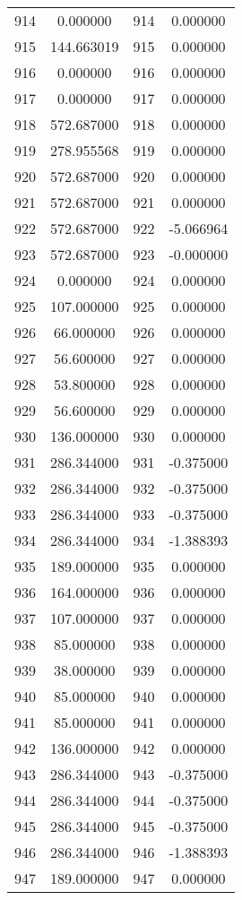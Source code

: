 \documentclass[12pt]{article}
\begin{document}
\begin{longtable}{@{}cccc@{}}
914 & 0.000000 & 914 & 0.000000 \\
915 & 144.663019 & 915 & 0.000000 \\
916 & 0.000000 & 916 & 0.000000 \\
917 & 0.000000 & 917 & 0.000000 \\
918 & 572.687000 & 918 & 0.000000 \\
919 & 278.955568 & 919 & 0.000000 \\
920 & 572.687000 & 920 & 0.000000 \\
921 & 572.687000 & 921 & 0.000000 \\
922 & 572.687000 & 922 & -5.066964 \\
923 & 572.687000 & 923 & -0.000000 \\
924 & 0.000000 & 924 & 0.000000 \\
925 & 107.000000 & 925 & 0.000000 \\
926 & 66.000000 & 926 & 0.000000 \\
927 & 56.600000 & 927 & 0.000000 \\
928 & 53.800000 & 928 & 0.000000 \\
929 & 56.600000 & 929 & 0.000000 \\
930 & 136.000000 & 930 & 0.000000 \\
931 & 286.344000 & 931 & -0.375000 \\
932 & 286.344000 & 932 & -0.375000 \\
933 & 286.344000 & 933 & -0.375000 \\
934 & 286.344000 & 934 & -1.388393 \\
935 & 189.000000 & 935 & 0.000000 \\
936 & 164.000000 & 936 & 0.000000 \\
937 & 107.000000 & 937 & 0.000000 \\
938 & 85.000000 & 938 & 0.000000 \\
939 & 38.000000 & 939 & 0.000000 \\
940 & 85.000000 & 940 & 0.000000 \\
941 & 85.000000 & 941 & 0.000000 \\
942 & 136.000000 & 942 & 0.000000 \\
943 & 286.344000 & 943 & -0.375000 \\
944 & 286.344000 & 944 & -0.375000 \\
945 & 286.344000 & 945 & -0.375000 \\
946 & 286.344000 & 946 & -1.388393 \\
947 & 189.000000 & 947 & 0.000000 \\

\end{longtable}
\end{document}
